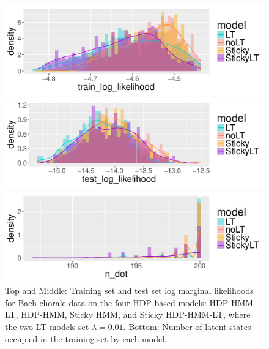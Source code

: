 \begin{figure}[tb]
\begin{center}
  \centerline{\includegraphics[width = 0.75\columnwidth]{fig/music/bach/lambda0p01/train_log_likelihood_density.pdf}}
  \centerline{\includegraphics[width = 0.75\columnwidth]{fig/music/bach/lambda0p01/test_log_likelihood_density.pdf}}
  \centerline{\includegraphics[width = 0.75\columnwidth]{fig/music/bach/lambda0p01/n_dot_density.pdf}}
\caption{Top and Middle: Training set and test set log marginal likelihoods for Bach
  chorale data on the four HDP-based models: HDP-HMM-LT, HDP-HMM,
  Sticky HMM, and Sticky HDP-HMM-LT, where the two LT models set
  $\lambda = 0.01$.  Bottom: Number of latent states
  occupied in the training set by each model. \label{fig:bach-hyperparameter-lambda0p01}
}
\end{center}
\end{figure}

